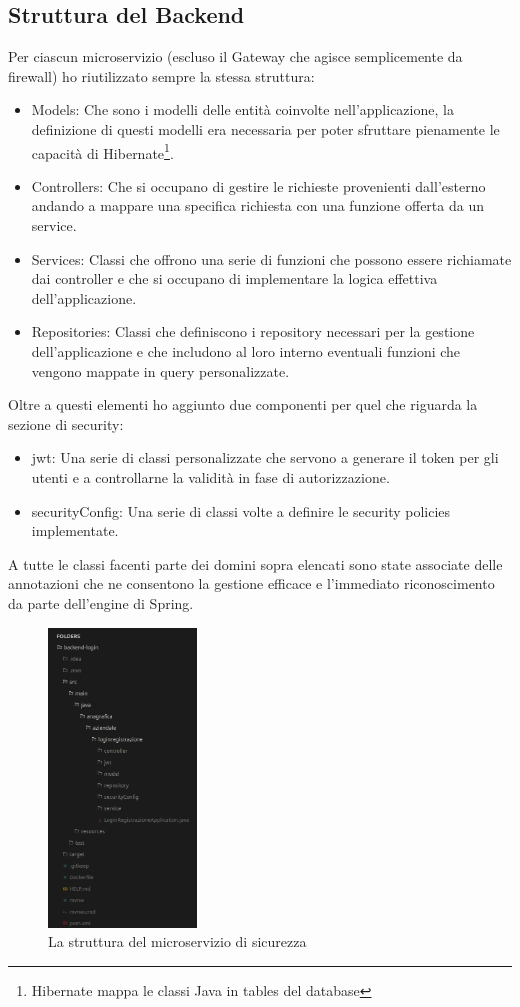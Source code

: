 \subsection{Struttura del Backend}
Per ciascun microservizio (escluso il Gateway che agisce semplicemente da firewall) ho riutilizzato sempre la stessa struttura:
\begin{itemize}
    \item Models: Che sono i modelli delle entità coinvolte nell'applicazione, la definizione di questi modelli era necessaria per poter sfruttare pienamente le capacità di Hibernate\footnote{Hibernate mappa le classi Java in tables del database}.
    \item Controllers: Che si occupano di gestire le richieste provenienti dall'esterno andando a mappare una specifica richiesta con una funzione offerta da un service.
    \item Services: Classi che offrono una serie di funzioni che possono essere richiamate dai controller e che si occupano di implementare la logica effettiva dell'applicazione.
    \item Repositories: Classi che definiscono i repository necessari per la gestione dell'applicazione e che includono al loro interno eventuali funzioni che vengono mappate in query personalizzate.
\end{itemize}
Oltre a questi elementi ho aggiunto due componenti per quel che riguarda la sezione di security:
\begin{itemize}
    \item jwt: Una serie di classi personalizzate che servono a generare il token per gli utenti e a controllarne la validità in fase di autorizzazione.
    \item securityConfig: Una serie di classi volte a definire le security policies implementate.
\end{itemize}
A tutte le classi facenti parte dei domini sopra elencati sono state associate delle annotazioni che ne consentono la gestione efficace e l'immediato riconoscimento da parte dell'engine di Spring.
\begin{figure}[h]
    \centering
    \includegraphics[height=300px]{./images/security_filesystem.png}
    \caption{La struttura del microservizio di sicurezza}
    \label{fig:micSecurity}
\end{figure}

